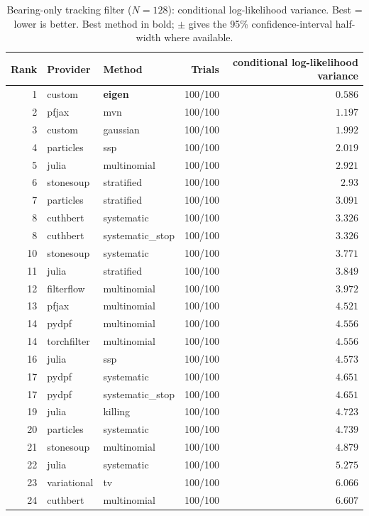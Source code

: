 \begin{table}[!htbp]
\centering
\small
\caption{Bearing-only tracking filter ($N=128$): conditional log-likelihood variance. Best = lower is better. Best method in bold; $\pm$ gives the 95\% confidence-interval half-width where available.}
\label{tab:bearing-only-tracking-filter-conditional-loglik-variance}
\begin{tabular}{rllrr}
\toprule
Rank & Provider & Method & Trials & conditional log-likelihood variance \\
\midrule
1 & custom & \textbf{eigen} & 100/100 & $\mathbf{0.586}$ \\
2 & pfjax & mvn & 100/100 & $1.197$ \\
3 & custom & gaussian & 100/100 & $1.992$ \\
4 & particles & ssp & 100/100 & $2.019$ \\
5 & julia & multinomial & 100/100 & $2.921$ \\
6 & stonesoup & stratified & 100/100 & $2.93$ \\
7 & particles & stratified & 100/100 & $3.091$ \\
8 & cuthbert & systematic & 100/100 & $3.326$ \\
8 & cuthbert & systematic\_stop & 100/100 & $3.326$ \\
10 & stonesoup & systematic & 100/100 & $3.771$ \\
11 & julia & stratified & 100/100 & $3.849$ \\
12 & filterflow & multinomial & 100/100 & $3.972$ \\
13 & pfjax & multinomial & 100/100 & $4.521$ \\
14 & pydpf & multinomial & 100/100 & $4.556$ \\
14 & torchfilter & multinomial & 100/100 & $4.556$ \\
16 & julia & ssp & 100/100 & $4.573$ \\
17 & pydpf & systematic & 100/100 & $4.651$ \\
17 & pydpf & systematic\_stop & 100/100 & $4.651$ \\
19 & julia & killing & 100/100 & $4.723$ \\
20 & particles & systematic & 100/100 & $4.739$ \\
21 & stonesoup & multinomial & 100/100 & $4.879$ \\
22 & julia & systematic & 100/100 & $5.275$ \\
23 & variational & tv & 100/100 & $6.066$ \\
24 & cuthbert & multinomial & 100/100 & $6.607$ \\

\end{tabular}
\end{table}
